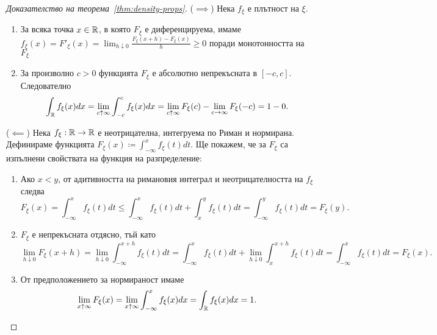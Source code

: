\documentclass[numbers=endperiod, DIV=15, bibliography=totocnumbered]{scrartcl}
\begin{document}
\begin{proof}[Доказателство на теорема~\ref{thm:density-props}]
  ($\implies$) Нека $f_\xi$ е плътност на $\xi$.
  \begin{enumerate}
    \item За всяка точка $x \in \mathbb{R}$, в която $F_\xi$ е диференцируема, имаме $f_\xi(x) = F'_\xi(x) = \lim_{h \downarrow 0} \frac {F_\xi(x + h) - F_\xi(x)} h \geq 0$ поради монотонността на $F_\xi$
    \item За произволно $c > 0$ функцията $F_\xi$ е абсолютно непрекъсната в $[-c, c]$. Следователно
    \begin{displaymath}
      \int_{\mathbb{R}} f_\xi(x) dx
      =
      \lim_{c \uparrow \infty} \int_{-c}^c f_\xi(x) dx
      =
      \lim_{c \uparrow \infty} F_\xi(c) - \lim_{c \to \infty} F_\xi(-c)
      =
      1 - 0.
    \end{displaymath}
  \end{enumerate}

  ($\impliedby$) Нека $f_\xi: \mathbb{R} \to \mathbb{R}$ е неотрицателна, интегруема по Риман и нормирана. Дефинираме функцията $F_\xi(x) \coloneqq \int_{-\infty}^x f_\xi(t) dt$. Ще покажем, че за $F_\xi$ са изпълнени свойствата на функция на разпределение:
  \begin{enumerate}
    \item Ако $x < y$, от адитивността на римановия интеграл и неотрицателността на $f_\xi$ следва
    \begin{displaymath}
      F_\xi(x)
      =
      \int_{-\infty}^x f_\xi(t) dt
      \leq
      \int_{-\infty}^x f_\xi(t) dt + \int_x^y f_\xi(t) dt
      =
      \int_{-\infty}^y f_\xi(t) dt
      =
      F_\xi(y).
    \end{displaymath}

    \item $F_\xi$ е непрекъсната отдясно, тъй като
    \begin{displaymath}
      \lim_{h \downarrow 0} F_\xi(x + h)
      =
      \lim_{h \downarrow 0} \int_{-\infty}^{x + h} f_\xi(t) dt
      =
      \int_{-\infty}^x f_\xi(t) dt + \lim_{h \downarrow 0} \int_x^{x + h} f_\xi(t) dt
      =
      \int_{-\infty}^x f_\xi(t) dt
      =
      F_\xi(x).
    \end{displaymath}

    \item От предположението за нормираност имаме
    \begin{displaymath}
      \lim_{x \uparrow \infty} F_\xi(x)
      =
      \lim_{x \uparrow \infty} \int_{-\infty}^x f_\xi(x) dx
      =
      \int_{\mathbb{R}} f_\xi(x) dx = 1.
    \end{displaymath}


\end{enumerate}
\end{proof}
\end{document}
